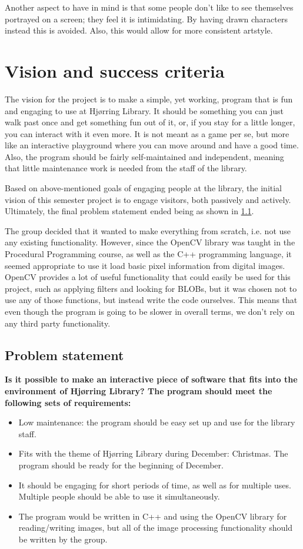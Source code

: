 Another aspect to have in mind is that some people don't like to see themselves portrayed on a screen; they feel it is intimidating. By having drawn characters instead this is avoided. Also, this would allow for more consistent artstyle.
  
\section{Vision and success criteria}
The vision for the project is to make a simple, yet working, program that is fun and engaging to use at Hj{\o}rring Library. It should be something you can just walk past once and get something fun out of it, or, if you stay for a little longer, you can interact with it even more. It is not meant as a game per se, but more like an interactive playground where you can move around and have a good time. Also, the program should be fairly self-maintained and independent, meaning that little maintenance work is needed from the staff of the library.

Based on above-mentioned goals of engaging people at the library, the initial vision of this semester project is to engage visitors, both passively and actively. Ultimately, the final problem statement ended being as shown in \ref{problemStatement}.

The group decided that it wanted to make everything from scratch, i.e. not use any existing functionality. However, since the OpenCV library was taught in the Procedural Programming course, as well as the C++ programming language, it seemed appropriate to use it load basic pixel information from digital images. OpenCV provides a lot of useful functionality that could easily be used for this project, such as applying filters and looking for BLOBs, but it was chosen not to use any of those functions, but instead write the code ourselves. This means that even though the program is going to be slower in overall terms, we don't rely on any third party functionality.

\subsection{Problem statement}\label{problemStatement}
\textbf{Is it possible to make an interactive piece of software that fits into the environment of Hj{\o}rring Library? The program should meet the following sets of requirements:}

\begin{itemize}
\item Low maintenance: the program should be easy set up and use for the library staff.
\item Fits with the theme of Hj{\o}rring Library during December: Christmas. The program should be ready for the beginning of December.
\item It should be engaging for short periods of time, as well as for multiple uses. Multiple people should be able to use it simultaneously.
\item The program would be written in C++ and using the OpenCV library for reading/writing images, but all of the image processing functionality should be written by the group.
\end{itemize}
